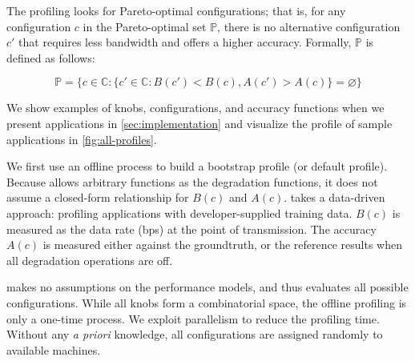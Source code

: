 The profiling looks for Pareto-optimal configurations; that is, for any
configuration $c$ in the Pareto-optimal set $\mathbb{P}$, there is no
alternative configuration $c'$ that requires less bandwidth and offers a higher
accuracy. Formally, $\mathbb{P}$ is defined as follows:

{\small \vspace{-1em}
  \begin{equation}
  \mathbb{P} = \{ c \in \mathbb{C} : \{ c' \in \mathbb{C}: B(c') < B(c),
  A(c') > A(c) \} = \varnothing\}
  \label{eq:pareto}
\end{equation}
}%

We show examples of knobs, configurations, and accuracy functions when we
present applications in \autoref{sec:implementation} and visualize the profile
of sample applications in \autoref{fig:all-profiles}.

 We first use an offline process to build a bootstrap
profile (or default profile).  Because \sysname{} allows arbitrary functions as
the degradation functions, it does not assume a closed-form relationship for
$B(c)$ and $A(c)$. \sysname{} takes a data-driven approach: profiling
applications with developer-supplied training data. $B(c)$ is measured as the
data rate (bps) at the point of transmission. The accuracy $A(c)$ is measured
either against the groundtruth, or the reference results when all degradation
operations are off.

\sysname{} makes no assumptions on the performance models, and thus evaluates
all possible configurations.  While all knobs form a combinatorial space, the
offline profiling is only a one-time process.  We exploit parallelism to reduce
the profiling time.  Without any \textit{a priori} knowledge, all configurations
are assigned randomly to available machines.


